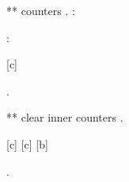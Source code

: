 ** counters
.
\thec: 

\addtocounter{c}{3 * -(2+1)}    %

\thec: 

\the\value{c}

[c]
\setcounter{a}{\value{c}}

.


** clear inner counters
.

[c]	%
[c]
[b]

\setcounter{a}{5}
\setcounter{b}{6}
\setcounter{d}{3}




.

